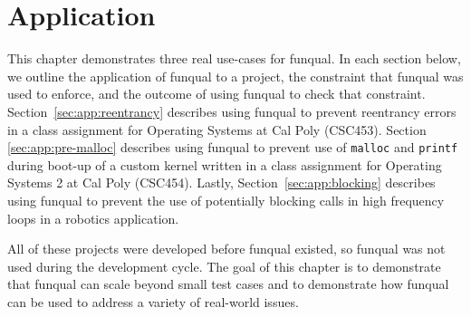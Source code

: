 \chapter{Application}\label{sec:application}

This chapter demonstrates three real use-cases for funqual.  In each section below, we outline the application of funqual to a project, the constraint that funqual was used to enforce, and the outcome of using funqual to check that constraint.  \mbox{Section \ref{sec:app:reentrancy}} describes using funqual to prevent reentrancy errors in a class assignment for Operating Systems at Cal Poly (CSC453).  Section \ref{sec:app:pre-malloc} describes using funqual to prevent use of \lstinline{malloc} and \lstinline{printf} during boot-up of a custom kernel written in a class assignment for Operating Systems 2 at Cal Poly (CSC454).  Lastly, \mbox{Section \ref{sec:app:blocking}} describes using funqual to prevent the use of potentially blocking calls in high frequency loops in a robotics application.  

All of these projects were developed before funqual existed, so funqual was not used during the development cycle.  The goal of this chapter is to demonstrate that funqual can scale beyond small test cases and to demonstrate how funqual can be used to address a variety of real-world issues.  






